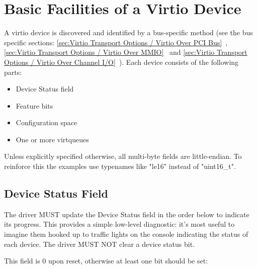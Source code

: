 \chapter{Basic Facilities of a Virtio Device}\label{sec:Basic Facilities of a Virtio Device}

A virtio device is discovered and identified by a bus-specific method
(see the bus specific sections: \ref{sec:Virtio Transport Options / Virtio Over PCI Bus}~,
\ref{sec:Virtio Transport Options / Virtio Over MMIO}~ and \ref{sec:Virtio Transport Options / Virtio Over Channel I/O}~).  Each
device consists of the following parts:

\begin{itemize}
\item Device Status field
\item Feature bits
\item Configuration space
\item One or more virtqueues
\end{itemize}

Unless explicitly specified otherwise, all multi-byte fields are little-endian.
To reinforce this the examples use typenames like "le16" instead of "uint16_t".

\section{Device Status Field}\label{sec:Basic Facilities of a Virtio Device / Device Status Field}

The driver MUST update the Device Status field in the order below to
indicate its progress. This provides a simple low-level diagnostic:
it's most useful to imagine them hooked up to traffic lights on the
console indicating the status of each device.  The driver MUST NOT
clear a device status bit.

This field is 0 upon reset, otherwise at least one bit should be set:


